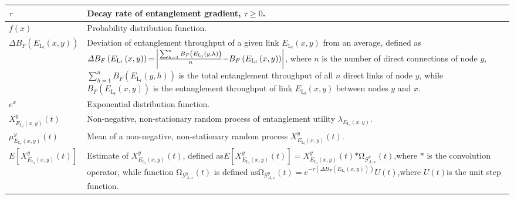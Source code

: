 \documentclass[11pt]{article}%
\begin{document}
\begin{longtable}{|p{1.6in}|p{2.8in}|}
$\tau $ & Decay rate of entanglement gradient, $\tau \mathrm{\ge }\mathrm{0}$. \\ \hline 
$f\left(x\right)$ & Probability distribution function. \\ \hline 
$\mathit{\Delta}B_F\left(E_{{\mathrm{L}}_l}\left(x,y\right)\right)$\textit{} & Deviation of entanglement throughput of a given link $E_{{\mathrm{L}}_l}\left(x,y\right)$ from an average, defined as \newline $\mathit{\Delta}B_F\left(E_{{\mathrm{L}}_l}\left(x,y\right)\right) \newline \mathrm{=}\left|\frac{\sum^n_{h\mathrm{=1}}{B_F\left(E_{{\mathrm{L}}_l}\left(y,h\right)\right)}}{n}\mathrm{-}B_F\left(E_{{\mathrm{L}}_l}\left(x,y\right)\right)\right|$,                        \newline where $n$ is the number of direct connections of node $y$, $\sum^n_{h\mathrm{=1}}{B_F\left(E_{{\mathrm{L}}_l}\left(y,h\right)\right)}$ is the total entanglement throughput of all $n$ direct links of node $y$, while $B_F\left(E_{{\mathrm{L}}_l}\left(x,y\right)\right)$ is the entanglement throughput of link $E_{{\mathrm{L}}_l}\left(x,y\right)$ between nodes $y$ and $x$. \\ \hline 
$e^x$ & Exponential distribution function. \\ \hline 
$X^y_{E_{{\mathrm{L}}_l}\left(x,y\right)}\left(t\right)$ & Non-negative, non-stationary random process of entanglement utility ${\lambda }_{E_{{\mathrm{L}}_l}\left(x,y\right)}$. \\ \hline 
${\mu }^y_{E_{{\mathrm{L}}_l}\left(x,y\right)}\left(t\right)$ & Mean of a non-negative, non-stationary random process $X^y_{E_{{\mathrm{L}}_l}\left(x,y\right)}\left(t\right)$. \\ \hline 
$E\left[X^y_{E_{{\mathrm{L}}_l}\left(x,y\right)}\left(t\right)\right]$ & Estimate of $X^y_{E_{{\mathrm{L}}_l}\left(x,y\right)}\left(t\right)$, defined as\newline $E\left[X^y_{E_{{\mathrm{L}}_l}\left(x,y\right)}\left(t\right)\right]\mathrm{=}X^y_{E_{{\mathrm{L}}_l}\left(x,y\right)}\left(t\right)\mathrm{*}{\mathrm{\Omega }}_{{\mathcal{G}}^y_{A,x}}\left(t\right)$,\newline where $\mathrm{*}$ is the convolution operator, while function ${\mathrm{\Omega }}_{{\mathcal{G}}^y_{A,x}}\left(t\right)$ is defined as\newline ${\mathrm{\Omega }}_{{\mathcal{G}}^y_{A,x}}\left(t\right)\mathrm{=}e^{\mathrm{-}\tau \left(\mathit{\Delta}B_F\left(E_{{\mathrm{L}}_l}\left(x,y\right)\right)\right)}U\left(t\right)$,\newline where $U\left(t\right)$is the unit step function.  \\ \hline 

\end{longtable}
\end{document}
